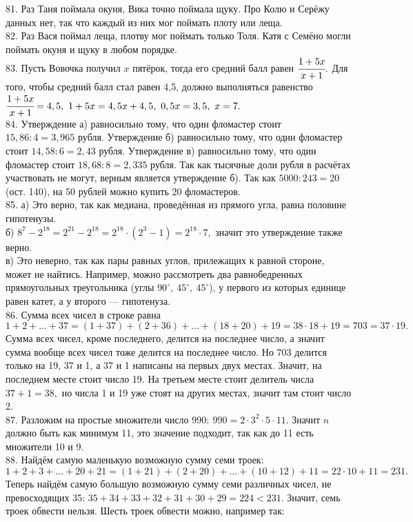 81. Раз Таня поймала окуня, Вика точно поймала щуку. Про Колю и Серёжу данных нет, так что каждый из них мог поймать плоту или леща.\\
82. Раз Вася поймал леща, плотву мог поймать только Толя. Катя с Семёно могли поймать окуня и щуку в любом порядке.\\
83. Пусть Вовочка получил $x$ пятёрок, тогда его средний балл равен $\cfrac{1+5x}{x+1}.$ Для того, чтобы средний балл стал равен 4,5, должно выполняться равенство
$\cfrac{1+5x}{x+1}=4,5,\ 1+5x=4,5x+4,5,\ 0,5x=3,5,\ x=7.$\\
84. Утверждение а) равносильно тому, что один фломастер стоит $15,86:4=3,965$ рубля. Утверждение б) равносильно тому, что один фломастер стоит $14,58:6=2,43$ рубля. Утверждение в) равносильно тому, что один фломастер стоит $18,68:8=2,335$ рубля. Так как тысячные доли рубля в расчётах участвовать не могут, верным является утверждение б).  Так как $5000:243=20$ (ост. 140), на 50 рублей можно купить 20 фломастеров.\\
85. а) Это верно, так как медиана, проведённая из прямого угла, равна половине гипотенузы.\\
б) $8^7-2^{18}=2^{21}-2^{18}=2^{18}\cdot(2^3-1)=2^{18}\cdot7,$ значит это утверждение также верно.\\
в) Это неверно, так как пары равных углов, прилежащих к равной стороне, может не найтись. Например, можно рассмотреть два равнобедренных прямоугольных треугольника (углы $90^\circ,\ 45^\circ,\ 45^\circ$), у первого из которых единице равен катет, а у второго --- гипотенуза.\\
86. Сумма всех чисел в строке равна $1+2+\ldots+37=(1+37)+(2+36)+\ldots+(18+20)+19=38\cdot18+19=703=37\cdot19.$ Сумма всех чисел, кроме последнего, делится на последнее число, а значит сумма вообще всех чисел тоже делится на последнее число. Но 703 делится только на 19, 37 и 1, а 37 и 1 написаны на первых двух местах. Значит, на последнем месте стоит число 19. На третьем месте стоит делитель числа $37+1=38,$ но числа 1 и 19 уже стоят на других местах, значит там стоит число 2.\\
87. Разложим на простые множители число $990:\ 990=2\cdot3^2\cdot5\cdot11.$ Значит $n$ должно быть как минимум 11, это значение подходит, так как до 11 есть множители 10 и 9.\\
88. Найдём самую маленькую возможную сумму семи троек: $1+2+3+\ldots+20+21=(1+21)+(2+20)+\ldots+(10+12)+11=22\cdot10+11=231.$ Теперь найдём самую большую возможную сумму семи различных чисел, не превосходящих 35: $35+34+33+32+31+30+29=224<231.$ Значит, семь троек обвести нельзя. Шесть троек обвести можно, например так:
